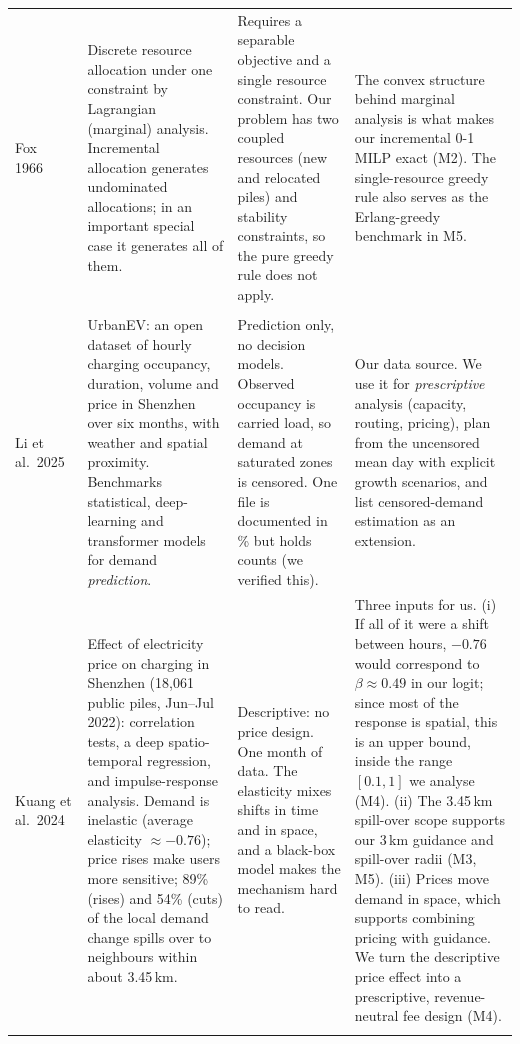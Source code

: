\documentclass[11pt,a4paper]{article}
\begin{document}
{\begin{longtable}{@{}L{1.9cm}L{4.4cm}L{3.9cm}L{4.9cm}@{}}
Fox 1966~\cite{fox1966} & Discrete resource allocation under one constraint by Lagrangian (marginal) analysis. Incremental allocation generates undominated allocations; in an important special case it generates all of them. & Requires a separable objective and a single resource constraint. Our problem has two coupled resources (new and relocated piles) and stability constraints, so the pure greedy rule does not apply. & The convex structure behind marginal analysis is what makes our incremental 0-1 MILP exact (M2). The single-resource greedy rule also serves as the Erlang-greedy benchmark in M5.\\\addlinespace
{}\\[2pt]
Li et al.\ 2025~\cite{li2025urbanev} & UrbanEV: an open dataset of hourly charging occupancy, duration, volume and price in Shenzhen over six months, with weather and spatial proximity. Benchmarks statistical, deep-learning and transformer models for demand \emph{prediction}. & Prediction only, no decision models. Observed occupancy is carried load, so demand at saturated zones is censored. One file is documented in \% but holds counts (we verified this). & Our data source. We use it for \emph{prescriptive} analysis (capacity, routing, pricing), plan from the uncensored mean day with explicit growth scenarios, and list censored-demand estimation as an extension.\\\addlinespace
Kuang et al.\ 2024~\cite{kuang2024} & Effect of electricity price on charging in Shenzhen (18{,}061 public piles, Jun--Jul 2022): correlation tests, a deep spatio-temporal regression, and impulse-response analysis. Demand is inelastic (average elasticity $\approx -0.76$); price rises make users more sensitive; 89\% (rises) and 54\% (cuts) of the local demand change spills over to neighbours within about 3.45\,km. & Descriptive: no price design. One month of data. The elasticity mixes shifts in time and in space, and a black-box model makes the mechanism hard to read. & Three inputs for us. (i) If all of it were a shift between hours, $-0.76$ would correspond to $\beta \approx 0.49$ in our logit; since most of the response is spatial, this is an upper bound, inside the range $[0.1, 1]$ we analyse (M4). (ii) The 3.45\,km spill-over scope supports our 3\,km guidance and spill-over radii (M3, M5). (iii) Prices move demand in space, which supports combining pricing with guidance. We turn the descriptive price effect into a prescriptive, revenue-neutral fee design (M4).\\\addlinespace

\end{longtable}}
\end{document}

